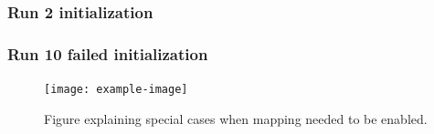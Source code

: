 \subsubsection{Run 2 initialization}
\label{sec:laverdiere_fail}

\lightlipsum[1]

\subsubsection{Run 10 failed initialization}
\label{sec:laverdiere_fail}

\lightlipsum[1]

\begin{figure} [htpb]
	\centering
	\texttt{[image: example-image]}
	\caption{Figure explaining special cases when mapping needed to be enabled.}
	\label{fig:icp_failure}
\end{figure}